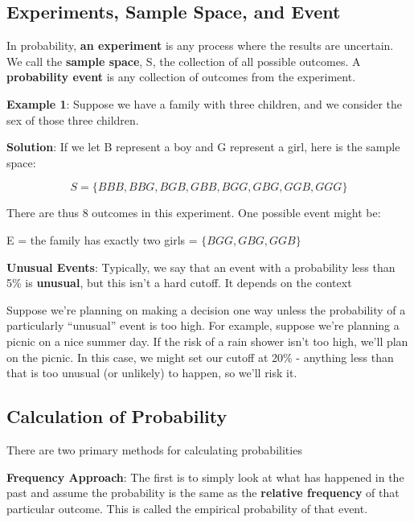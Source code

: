 \documentclass[
]{book}
\begin{document}
\hypertarget{experiments-sample-space-and-event}{%
\subsection{Experiments, Sample Space, and Event}\label{experiments-sample-space-and-event}}

In probability, \textbf{an experiment} is any process where the results are uncertain. We call the \textbf{sample space}, S, the collection of all possible outcomes. A \textbf{probability event} is any collection of outcomes from the experiment.

\textbf{Example 1}: Suppose we have a family with three children, and we consider the sex of those three children.

\textbf{Solution}: If we let B represent a boy and G represent a girl, here is the sample space:

\[S = \{ BBB, BBG, BGB, GBB, BGG, GBG, GGB, GGG\}\]

There are thus 8 outcomes in this experiment. One possible event might be:

E = the family has exactly two girls = \(\{ BGG, GBG, GGB \}\)

\textbf{Unusual Events}: Typically, we say that an event with a probability less than 5\% is \textbf{unusual}, but this isn't a hard cutoff. It depends on the context

Suppose we're planning on making a decision one way unless the probability of a particularly ``unusual'' event is too high. For example, suppose we're planning a picnic on a nice summer day. If the risk of a rain shower isn't too high, we'll plan on the picnic. In this case, we might set our cutoff at 20\% - anything less than that is too unusual (or unlikely) to happen, so we'll risk it.

\hypertarget{calculation-of-probability}{%
\subsection{Calculation of Probability}\label{calculation-of-probability}}

There are two primary methods for calculating probabilities

\textbf{Frequency Approach}: The first is to simply look at what has happened in the past and assume the probability is the same as the \textbf{relative frequency} of that particular outcome. This is called the empirical probability of that event.

\hfill\break
\end{document}
